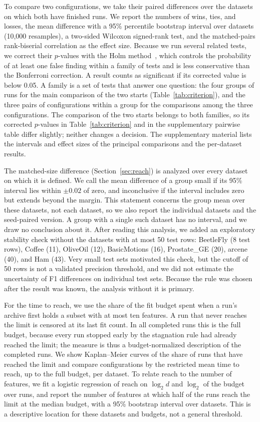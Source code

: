 To compare two configurations, we take their paired differences over the datasets on which both have finished runs. We report the numbers of wins, ties, and losses, the mean difference with a 95\% percentile bootstrap interval over datasets (10{,}000 resamples), a two-sided Wilcoxon signed-rank test, and the matched-pairs rank-biserial correlation as the effect size. Because we run several related tests, we correct their $p$-values with the Holm method~\cite{Holm1979}, which controls the probability of at least one false finding within a family of tests and is less conservative than the Bonferroni correction. A result counts as significant if its corrected value is below 0.05. A family is a set of tests that answer one question: the four groups of runs for the main comparison of the two starts (Table~\ref{tab:criterion}), and the three pairs of configurations within a group for the comparisons among the three configurations. The comparison of the two starts belongs to both families, so its corrected $p$-values in Table~\ref{tab:criterion} and in the supplementary pairwise table differ slightly; neither changes a decision. The supplementary material lists the intervals and effect sizes of the principal comparisons and the per-dataset results.

The matched-size difference (Section~\ref{sec:reach}) is analyzed over every dataset on which it is defined. We call the mean difference of a group small if its 95\% interval lies within $\pm 0.02$ of zero, and inconclusive if the interval includes zero but extends beyond the margin. This statement concerns the group mean over these datasets, not each dataset, so we also report the individual datasets and the seed-paired version. A group with a single such dataset has no interval, and we draw no conclusion about it. After reading this analysis, we added an exploratory stability check without the datasets with at most 50 test rows: BeetleFly (8 test rows), Coffee (11), OliveOil (12), BasicMotions (16), Prostate\_GE (20), arcene (40), and Ham (43). Very small test sets motivated this check, but the cutoff of 50 rows is not a validated precision threshold, and we did not estimate the uncertainty of F1 differences on individual test sets. Because the rule was chosen after the result was known, the analysis without it is primary.

For the time to reach, we use the share of the fit budget spent when a run's archive first holds a subset with at most ten features. A run that never reaches the limit is censored at its last fit count. In all completed runs this is the full budget, because every run stopped early by the stagnation rule had already reached the limit; the measure is thus a budget-normalized description of the completed runs. We show Kaplan--Meier curves of the share of runs that have reached the limit and compare configurations by the restricted mean time to reach, up to the full budget, per dataset. To relate reach to the number of features, we fit a logistic regression of reach on $\log_2 d$ and $\log_2$ of the budget over runs, and report the number of features at which half of the runs reach the limit at the median budget, with a 95\% bootstrap interval over datasets. This is a descriptive location for these datasets and budgets, not a general threshold.

